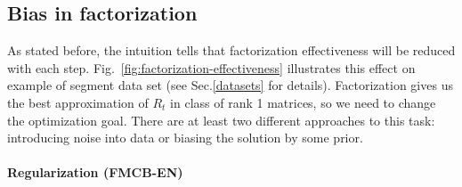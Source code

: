 \documentclass{article}
\begin{document}
\subsection{Bias in factorization}
As stated before, the intuition tells that factorization effectiveness will be reduced with each step. Fig.~\ref{fig:factorization-effectiveness} illustrates this effect on example of segment data set (see Sec.\ref{datasets} for details). Factorization gives us the best approximation of $R_t$ in class of rank 1 matrices, so we need to change the optimization goal. There are at least two different approaches to this task: introducing noise into data or biasing the solution by some prior.

\paragraph{Regularization (FMCB-EN)} %
\label{par:regularization}
\end{document}
